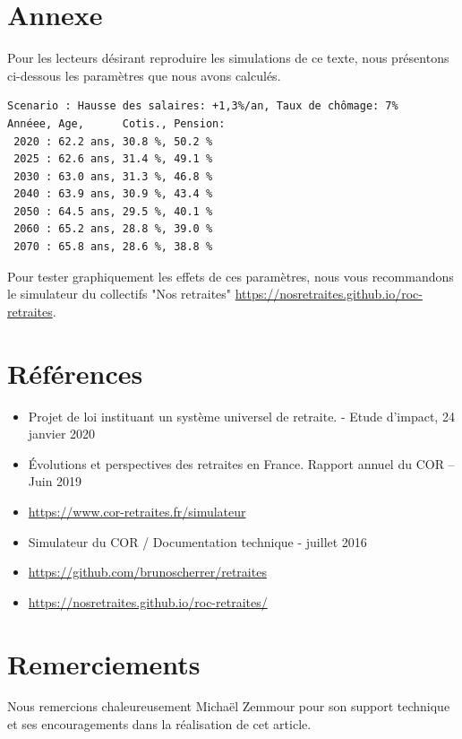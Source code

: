\documentclass[10pt]{article}
\begin{document}

\section{Annexe}

Pour les lecteurs désirant reproduire les simulations de ce texte, 
nous présentons ci-dessous les paramètres que nous avons calculés.
\begin{verbatim}
Scenario : Hausse des salaires: +1,3%/an, Taux de chômage: 7%
Annéee, Age,      Cotis., Pension:
 2020 : 62.2 ans, 30.8 %, 50.2 %
 2025 : 62.6 ans, 31.4 %, 49.1 %
 2030 : 63.0 ans, 31.3 %, 46.8 %
 2040 : 63.9 ans, 30.9 %, 43.4 %
 2050 : 64.5 ans, 29.5 %, 40.1 %
 2060 : 65.2 ans, 28.8 %, 39.0 %
 2070 : 65.8 ans, 28.6 %, 38.8 %
\end{verbatim}

Pour tester graphiquement les effets de ces paramètres, nous vous recommandons le 
simulateur du collectifs "Nos retraites" \url{https://nosretraites.github.io/roc-retraites}. 


\section{Références}

\begin{itemize}
\item Projet de loi instituant un système universel de retraite. - Etude d'impact, 24 janvier 2020
\item Évolutions et perspectives des retraites en France. Rapport annuel du COR – Juin 2019
\item \url{https://www.cor-retraites.fr/simulateur}
\item Simulateur du COR / Documentation technique - juillet 2016
\item \url{https://github.com/brunoscherrer/retraites}
\item \url{https://nosretraites.github.io/roc-retraites/}
\end{itemize}


\section{Remerciements}

Nous remercions chaleureusement Michaël Zemmour pour son support 
technique et ses encouragements dans la réalisation de cet article. 
\end{document}
